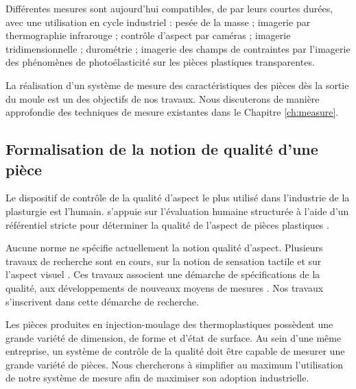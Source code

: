 Différentes mesures sont aujourd'hui compatibles, de par leurs courtes durées, avec une utilisation en cycle industriel : pesée de la masse ; imagerie par thermographie infrarouge ; contrôle d'aspect par caméras ; imagerie tridimensionnelle \cite{schwenke_optical_2002} ; durométrie ; imagerie des champs de contraintes par l'imagerie des phénomènes de photoélasticité sur les pièces plastiques transparentes.

La réalisation d'un système de mesure des caractéristiques des pièces dès la sortie du moule est un des objectifs de nos travaux.
Nous discuterons de manière approfondie des techniques de mesure existantes dans le Chapitre \ref{ch:measure}.

\subsection{Formalisation de la notion de qualité d'une pièce}
Le dispositif de contrôle de la qualité d'aspect le plus utilisé dans l'industrie de la plasturgie est l'humain.
\citeauthor{passaro_du_2014} s'appuie sur l'évaluation humaine structurée à l'aide d'un référentiel stricte pour déterminer la qualité de l'aspect de pièces plastiques \cite{passaro_du_2014}.

Aucune norme ne spécifie actuellement la notion qualité d'aspect.
Plusieurs travaux de recherche sont en cours, sur la notion de sensation tactile \cite{bruno_albert_formalisation_2016, albert_generic_2016, albert_smart_2017, albert_smart_2019, albert_maitrise_2019} et sur l'aspect visuel \cite{desage_syntactic_2015}.
Ces travaux associent une démarche de spécifications de la qualité, aux développements de nouveaux moyens de mesures \cite{desage_constraints_2015, pitard_metrologie_2016, lacombe_exploitation_2018a}.
Nos travaux s'inscrivent dans cette démarche de recherche.

Les pièces produites en injection-moulage des thermoplastiques possèdent une grande variété de dimension, de forme et d'état de surface.
Au sein d'une même entreprise, un système de contrôle de la qualité doit être capable de mesurer une grande variété de pièces.
Nous chercherons à simplifier au maximum l'utilisation de notre système de mesure afin de maximiser son adoption industrielle.   %

